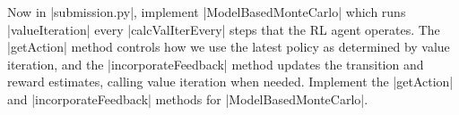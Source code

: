 \item {}

Now in |submission.py|, implement |ModelBasedMonteCarlo| which runs |valueIteration| 
every |calcValIterEvery| steps that the RL agent operates. The |getAction| method controls how we use the latest policy as determined by value iteration, 
and the |incorporateFeedback| method updates the transition and reward estimates, calling value iteration when needed.
Implement the |getAction| and |incorporateFeedback| methods for |ModelBasedMonteCarlo|.

